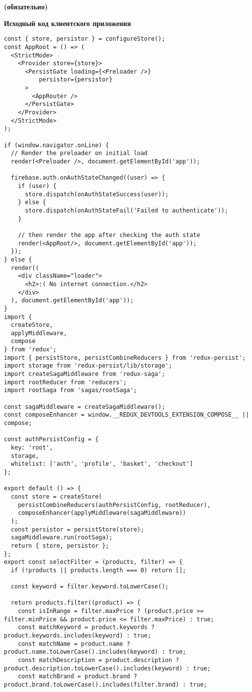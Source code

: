 \centerline{\bfseries (обязательно)}

\centerline{\bfseries Исходный код клиентского приложения}

\begin{lstlisting}
const { store, persistor } = configureStore();
const AppRoot = () => (
  <StrictMode>
    <Provider store={store}>
      <PersistGate loading={<Preloader />}
          persistor={persistor}
      >
        <AppRouter />
      </PersistGate>
    </Provider>
  </StrictMode>
);

if (window.navigator.onLine) {
  // Render the preloader on initial load
  render(<Preloader />, document.getElementById('app'));

  firebase.auth.onAuthStateChanged((user) => {
    if (user) {
      store.dispatch(onAuthStateSuccess(user));
    } else {
      store.dispatch(onAuthStateFail('Failed to authenticate'));
    }

    // then render the app after checking the auth state
    render(<AppRoot/>, document.getElementById('app'));
  });
} else {
  render((
    <div className="loader">
      <h2>:( No internet connection.</h2>
    </div>
  ), document.getElementById('app'));
}
import {
  createStore,
  applyMiddleware,
  compose
} from 'redux';
import { persistStore, persistCombineReducers } from 'redux-persist';
import storage from 'redux-persist/lib/storage';
import createSagaMiddleware from 'redux-saga';
import rootReducer from 'reducers';
import rootSaga from 'sagas/rootSaga';

const sagaMiddleware = createSagaMiddleware();
const composeEnhancer = window.__REDUX_DEVTOOLS_EXTENSION_COMPOSE__ || compose;

const authPersistConfig = {
  key: 'root',
  storage,
  whitelist: ['auth', 'profile', 'basket', 'checkout']
};

export default () => {
  const store = createStore(
    persistCombineReducers(authPersistConfig, rootReducer),
    composeEnhancer(applyMiddleware(sagaMiddleware))
  );
  const persistor = persistStore(store);
  sagaMiddleware.run(rootSaga);
  return { store, persistor };
};
export const selectFilter = (products, filter) => {
  if (!products || products.length === 0) return [];

  const keyword = filter.keyword.toLowerCase();

  return products.filter((product) => {
    const isInRange = filter.maxPrice ? (product.price >= filter.minPrice && product.price <= filter.maxPrice) : true;
    const matchKeyword = product.keywords ? product.keywords.includes(keyword) : true;
    const matchName = product.name ? product.name.toLowerCase().includes(keyword) : true;
    const matchDescription = product.description ? product.description.toLowerCase().includes(keyword) : true;
    const matchBrand = product.brand ? product.brand.toLowerCase().includes(filter.brand) : true;


\end{lstlisting}
